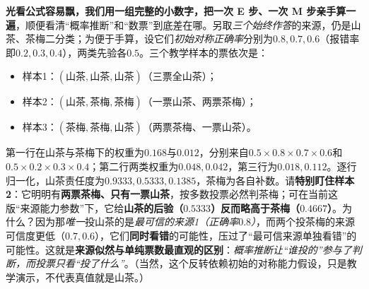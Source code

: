 \textbf{光看公式容易飘，我们用一组完整的小数字，把一次 E 步、一次 M 步亲手算一遍}，顺便看清“概率推断”和“数票”到底差在哪。另取\emph{三个始终作答}的来源，仍是山茶、茶梅二分类；为便于手算，设它们\emph{初始对称正确率}分别为$0.8,0.7,0.6$（报错率即$0.2,0.3,0.4$），两类先验各$0.5$。三个教学样本的票依次是：
\begin{itemize}\item 样本1：$(\text{山茶},\text{山茶},\text{山茶})$（三票全山茶）；\item 样本2：$(\text{山茶},\text{茶梅},\text{茶梅})$（一票山茶、两票茶梅）；\item 样本3：$(\text{茶梅},\text{茶梅},\text{山茶})$（两票茶梅、一票山茶）。\end{itemize}第一行在山茶与茶梅下的权重为$0.168$与$0.012$，分别来自$0.5\times0.8\times0.7\times0.6$和$0.5\times0.2\times0.3\times0.4$；第二行两类权重为$0.048,0.042$，第三行为$0.018,0.112$。逐行归一化，山茶责任度为$0.9333,0.5333,0.1385$，茶梅为各自补数。请\textbf{特别盯住样本2}：它明明有\textbf{两票茶梅、只有一票山茶}，按多数投票必然判茶梅；可在当前这版“来源能力参数”下，它给\textbf{山茶的后验（$0.5333$）反而略高于茶梅（$0.4667$）}。为什么？因为那\emph{唯一}投山茶的是\emph{最可信的来源1（正确率$0.8$）}，而两个投茶梅的来源可信度更低（$0.7,0.6$），它们\textbf{同时看错}的可能性，压过了“最可信来源单独看错”的可能性。这就是\textbf{来源似然与单纯票数最直观的区别}：\emph{概率推断让“谁投的”参与了判断，而投票只看“投了什么”}。（当然，这个反转依赖初始的对称能力假设，只是教学演示，不代表真值就是山茶。）

